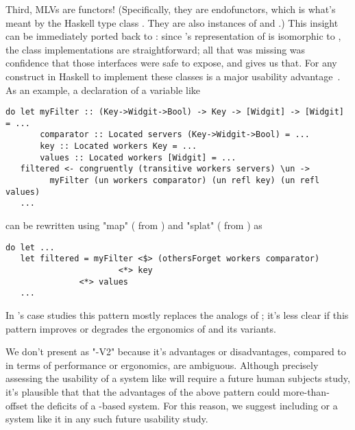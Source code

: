 Third, MLVs are functors!
(Specifically, they are endofunctors, which is what's meant by the Haskell type class .
They are also instances of  and .)
This insight can be immediately ported back to \MultiChor:
since \MultiChor's representation of  is isomorphic to ,
the class implementations are straightforward;
all that was missing was confidence that those interfaces were safe to expose, and \minichor gives us that.
For any construct in Haskell to implement these classes is a major usability advantage~\cite[Chapter~4]{haskell-cookbook}.
As an example, a \MultiChor declaration of a variable  like
\begin{verbatim}
do let myFilter :: (Key->Widgit->Bool) -> Key -> [Widgit] -> [Widgit] = ...
       comparator :: Located servers (Key->Widgit->Bool) = ...
       key :: Located workers Key = ...
       values :: Located workers [Widgit] = ...
   filtered <- congruently (transitive workers servers) \un ->
         myFilter (un workers comparator) (un refl key) (un refl values)
   ...
\end{verbatim}
can be rewritten using "map" (\inlinecode{<$>} from ) and "splat" (\inlinecode{<*>} from ) as
\begin{verbatim}
do let ...
   let filtered = myFilter <$> (othersForget workers comparator)
	                   <*> key
			   <*> values
   ...
\end{verbatim}
In \minichor's case studies this pattern mostly replaces the analogs of ;
it's less clear if this pattern improves or degrades the ergonomics of  and its variants.

We don't present \minichor as "\MultiChor-V2"
because it's advantages or disadvantages, compared to \MultiChor in terms of performance or ergonomics, are ambiguous.
Although precisely assessing the usability of a system like \MultiChor will require a future human subjects study,
it's plausible that that the advantages of the above pattern could more-than-offset the deficits of a -based system.
For this reason, we suggest including \minichor or a system like it in any such future usability study.




